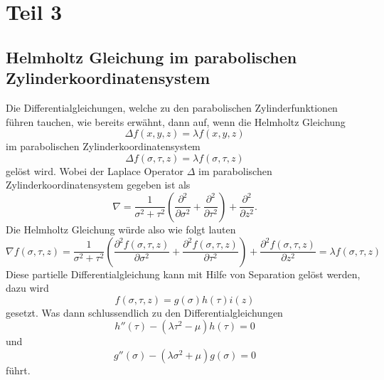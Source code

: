 %
%
%
\section{Teil 3
\label{parzyl:section:teil3}}
\subsection{Helmholtz Gleichung im parabolischen Zylinderkoordinatensystem
\label{parzyl:subsection:malorum}}
Die Differentialgleichungen, welche zu den parabolischen Zylinderfunktionen führen tauchen, wie bereits erwähnt, dann auf, wenn die Helmholtz Gleichung
\begin{equation}
	\Delta f(x,y,z) = \lambda f(x,y,z) 
\end{equation}
im parabolischen Zylinderkoordinatensystem
\begin{equation}
	\Delta f(\sigma,\tau,z) = \lambda f(\sigma,\tau,z) 
\end{equation}
gelöst wird.
Wobei der Laplace Operator $\Delta$ im parabolischen Zylinderkoordinatensystem gegeben ist als
\begin{equation}
	\nabla 
	= 
	\frac{1}{\sigma^2 + \tau^2}
	\left ( 
	\frac{\partial^2}{\partial \sigma^2} 
	+ 
	\frac{\partial^2}{\partial \tau^2}
	\right )
	+ 
	\frac{\partial^2}{\partial z^2}.
\end{equation}
Die Helmholtz Gleichung würde also wie folgt lauten
\begin{equation}
	\nabla f(\sigma, \tau, z)
	=
	\frac{1}{\sigma^2 + \tau^2}
	\left ( 
	\frac{\partial^2 f(\sigma,\tau,z)}{\partial \sigma^2} 
	+ 
	\frac{\partial^2 f(\sigma,\tau,z)}{\partial \tau^2}
	\right )
	+ 
	\frac{\partial^2 f(\sigma,\tau,z)}{\partial z^2}
	= 
	\lambda f(\sigma,\tau,z)
\end{equation}
Diese partielle Differentialgleichung kann mit Hilfe von Separation gelöst werden, dazu wird 
\begin{equation}
	f(\sigma,\tau,z) = g(\sigma)h(\tau)i(z)
\end{equation}
gesetzt. 
Was dann schlussendlich zu den Differentialgleichungen 
\begin{equation}
	h''(\tau) 
	- 
	\left (
	\lambda\tau^2
	-
	\mu 
	\right )
	h(\tau)
	=
	0
\end{equation}
und 
\begin{equation}
	g''(\sigma) 
	- 
	\left (
	\lambda\sigma^2
	+
	\mu 
	\right )
	g(\sigma)
	=
	0
\end{equation}
führt.
